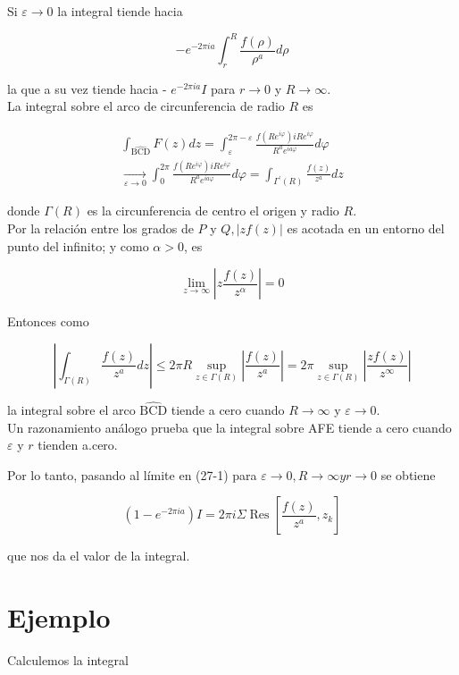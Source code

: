 \documentclass[10pt]{article}
\theoremstyle{plain}
\theoremstyle{definition}
\theoremstyle{remark}
\begin{document}
Si $\varepsilon \rightarrow 0$ la integral tiende hacia

$$
-e^{-2 \pi i a} \int_{r}^{R} \frac{f(\rho)}{\rho^{a}} d \rho
$$

la que a su vez tiende hacia - $e^{-2 \pi i a} I$ para $r \rightarrow 0$ y $R \rightarrow \infty$.\\
La integral sobre el arco de circunferencia de radio $R$ es

$$
\begin{gathered}
\int_{\widehat{\mathrm{BCD}}} F(z) d z=\int_{\varepsilon}^{2 \pi-\varepsilon} \frac{f\left(R e^{i \varphi}\right) i R e^{i \varphi}}{R^{a} e^{i a \varphi}} d \varphi \\
\underset{\varepsilon \rightarrow 0}{\longrightarrow} \int_{0}^{2 \pi} \frac{f\left(R e^{i \varphi}\right) i R e^{i \varphi}}{R^{a} e^{i a \varphi}} d \varphi=\int_{\Gamma^{\prime}(R)} \frac{f(z)}{z^{a}} d z
\end{gathered}
$$

donde $\Gamma(R)$ es la circunferencia de centro el origen y radio $R$.\\
Por la relación entre los grados de $P$ y $Q,|z f(z)|$ es acotada en un entorno del punto del infinito; y como $\alpha>0$, es

$$
\lim _{z \rightarrow \infty}\left|z \frac{f(z)}{z^{\alpha}}\right|=0
$$

Entonces como

$$
\left|\int_{\Gamma(R)} \frac{f(z)}{z^{a}} d z\right| \leqslant 2 \pi R \sup _{z \in \Gamma(R)}\left|\frac{f(z)}{z^{a}}\right|=2 \pi \sup _{z \in \Gamma(R)}\left|\frac{z f(z)}{z^{\infty}}\right|
$$

la integral sobre el arco $\widehat{\mathrm{BCD}}$ tiende a cero cuando $R \rightarrow \infty$ y $\varepsilon \rightarrow 0$.\\
Un razonamiento análogo prueba que la integral sobre AFE tiende a cero cuando $\varepsilon$ y $r$ tienden a.cero.

Por lo tanto, pasando al límite en (27-1) para $\varepsilon \rightarrow 0, R \rightarrow \infty y r \rightarrow 0$ se obtiene


\begin{equation*}
\left(1-e^{-2 \pi i a}\right) I=2 \pi i \Sigma \operatorname{Res}\left[\frac{f(z)}{z^{a}}, z_{k}\right] \tag{27-2}
\end{equation*}


que nos da el valor de la integral.

\section*{Ejemplo}
Calculemos la integral
\end{document}
